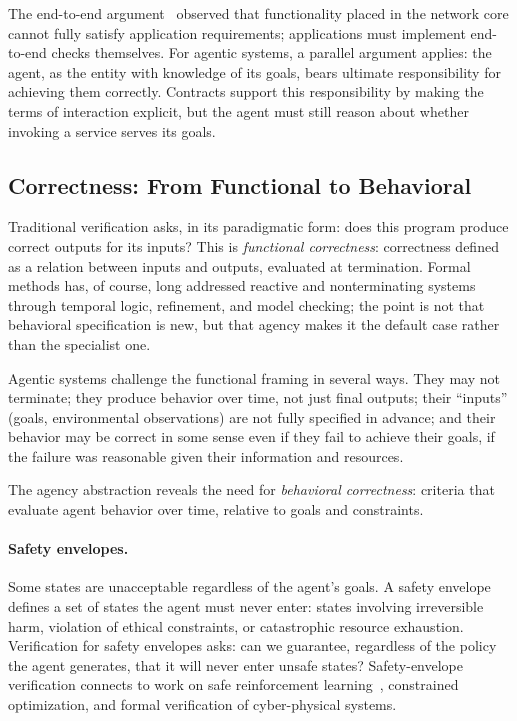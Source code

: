 \documentclass[11pt]{article}
\begin{document}
The end-to-end argument~\cite{saltzer_end_to_end} observed that functionality placed in the network core cannot fully satisfy application requirements; applications must implement end-to-end checks themselves. For agentic systems, a parallel argument applies: the agent, as the entity with knowledge of its goals, bears ultimate responsibility for achieving them correctly. Contracts support this responsibility by making the terms of interaction explicit, but the agent must still reason about whether invoking a service serves its goals.

\subsection{Correctness: From Functional to Behavioral}
\label{sec:correctness}

Traditional verification asks, in its paradigmatic form: does this program produce correct outputs for its inputs? This is \textit{functional correctness\/}: correctness defined as a relation between inputs and outputs, evaluated at termination. Formal methods has, of course, long addressed reactive and nonterminating systems through temporal logic, refinement, and model checking; the point is not that behavioral specification is new, but that agency makes it the default case rather than the specialist one.

Agentic systems challenge the functional framing in several ways. They may not terminate; they produce behavior over time, not just final outputs; their ``inputs'' (goals, environmental observations) are not fully specified in advance; and their behavior may be correct in some sense even if they fail to achieve their goals, if the failure was reasonable given their information and resources.

The agency abstraction reveals the need for \textit{behavioral correctness}: criteria that evaluate agent behavior over time, relative to goals and constraints.

\paragraph{Safety envelopes.} Some states are unacceptable regardless of the agent's goals. A safety envelope defines a set of states the agent must never enter: states involving irreversible harm, violation of ethical constraints, or catastrophic resource exhaustion. Verification for safety envelopes asks: can we guarantee, regardless of the policy the agent generates, that it will never enter unsafe states? Safety-envelope verification connects to work on safe reinforcement learning~\cite{garcia_safe_rl}, constrained optimization, and formal verification of cyber-physical systems.
\end{document}
